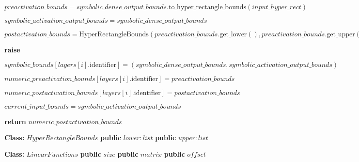 \begin{algorithm}[t!]
\begin{algorithmic}[1]
            			\State $preactivation\_bounds = symbolic\_dense\_output\_bounds.\text{to\_hyper\_rectangle\_bounds}(input\_hyper\_rect)$
            
            			\State $symbolic\_activation\_output\_bounds = symbolic\_dense\_output\_bounds$
            
            			\State $postactivation\_bounds = \text{HyperRectangleBounds}(preactivation\_bounds.\text{get\_lower}(), preactivation\_bounds.\text{get\_upper}())$
            
        				\Else
            				\State \textbf{raise}             
        			\EndIf
        
        			\State $symbolic\_bounds[layers[i].\text{identifier}] = (symbolic\_dense\_output\_bounds, symbolic\_activation\_output\_bounds)$
        
        			\State $numeric\_preactivation\_bounds[layers[i].\text{identifier}] = preactivation\_bounds$
        
        			\State $numeric\_postactivation\_bounds[layers[i].\text{identifier}] = postactivation\_bounds$
        
        			\State $current\_input\_bounds = symbolic\_activation\_output\_bounds$
        
    		\EndFor
    
    		\State \textbf{return} $numeric\_postactivation\_bounds$
    
	\EndFunction
\end{algorithmic}
\end{algorithm}

\begin{algorithm}
\label{alg:hyper-rect-bound}
	\begin{algorithmic}[1]
		\State \textbf{Class:} $HyperRectangleBounds$
		\State \quad \textbf{public} $lower: list$
		\State \quad \textbf{public} $upper: list$
	\end{algorithmic}
\end{algorithm}


\begin{algorithm}
	\label{alg:linear-functions}
	\begin{algorithmic}[1]
		\State \textbf{Class:} $LinearFunctions$
		\State \quad \textbf{public} $size$
		\State \quad \textbf{public} $matrix$
		\State \quad \textbf{public} $offset$
	\end{algorithmic}
\end{algorithm}

